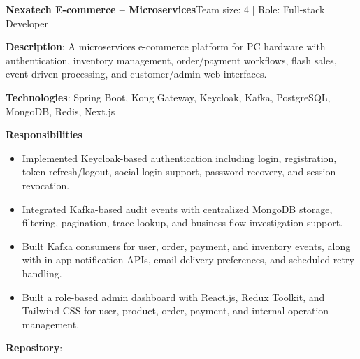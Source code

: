   \resumeProjectHeading
    {\textbf{Nexatech E-commerce -- Microservices}}{Team size: 4 | Role: Full-stack Developer}
    \resumeItemListStart
      \item \textbf{Description}: A microservices e-commerce platform for PC hardware with authentication, inventory management, order/payment workflows, flash sales, event-driven processing, and customer/admin web interfaces.
      \item \textbf{Technologies}: Spring Boot, Kong Gateway, Keycloak, Kafka, PostgreSQL, MongoDB, Redis, Next.js
      \item \textbf{Responsibilities}
        \begin{itemize}
          \item Implemented Keycloak-based authentication including login, registration, token refresh/logout, social login support, password recovery, and session revocation.
          \item Integrated Kafka-based audit events with centralized MongoDB storage, filtering, pagination, trace lookup, and business-flow investigation support.
          \item Built Kafka consumers for user, order, payment, and inventory events, along with in-app notification APIs, email delivery preferences, and scheduled retry handling.
          \item Built a role-based admin dashboard with React.js, Redux Toolkit, and Tailwind CSS for user, product, order, payment, and internal operation management.
        \end{itemize}
      \item \textbf{Repository}: \href{https://github.com/nvminh162-archive/nexatech-ecommerce}{}
    \resumeItemListEnd

